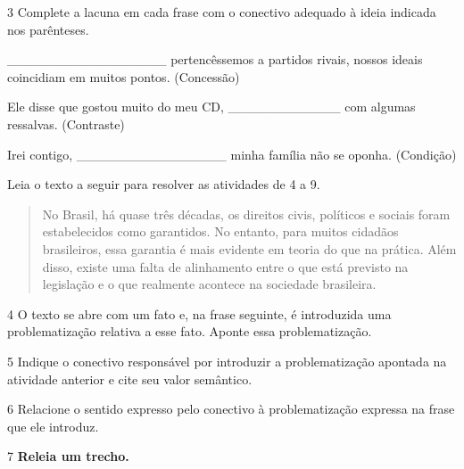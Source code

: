 \num{3} Complete a lacuna em cada frase com o conectivo adequado à ideia
indicada nos parênteses.



\_\_\_\_\_\_\_\_\_\_\_\_\_\_\_\_\_  pertencêssemos a
partidos rivais, nossos ideais coincidiam em muitos pontos. (Concessão)

Ele disse que gostou muito do meu CD,
\_\_\_\_\_\_\_\_\_\_\_\_  com algumas ressalvas. (Contraste)

Irei contigo, \_\_\_\_\_\_\_\_\_\_\_\_\_\_\_\_  minha
família não se oponha. (Condição)


Leia o texto a seguir para resolver as atividades de 4 a 9.

\begin{quote}
No Brasil, há quase três décadas, os direitos civis, políticos e sociais
foram estabelecidos como garantidos. No entanto, para muitos cidadãos
brasileiros, essa garantia é mais evidente em teoria do que na prática.
Além disso, existe uma falta de alinhamento entre o que está previsto na
legislação e o que realmente acontece na sociedade brasileira.
\end{quote}


\num{4} O texto se abre com um fato e, na frase seguinte, é introduzida
uma problematização relativa a esse fato. Aponte essa problematização.


\num{5} Indique o conectivo responsável por introduzir a problematização
apontada na atividade anterior e cite seu valor semântico.


\num{6} Relacione o sentido expresso pelo conectivo à problematização
expressa na frase que ele introduz.


\num{7} \textbf{Releia um trecho.}

